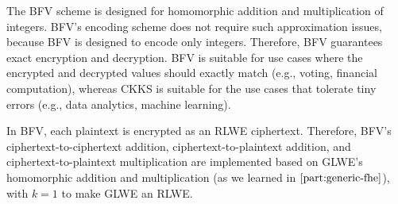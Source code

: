 The BFV scheme is designed for homomorphic addition and multiplication of integers. BFV's encoding scheme does not require such approximation issues, because BFV is designed to encode only integers. Therefore, BFV guarantees exact encryption and decryption. BFV is suitable for use cases where the encrypted and decrypted values should exactly match (e.g., voting, financial computation), whereas CKKS is suitable for the use cases that tolerate tiny errors (e.g., data analytics, machine learning).  

In BFV, each plaintext is encrypted as an RLWE ciphertext. Therefore, BFV's ciphertext-to-ciphertext addition, ciphertext-to-plaintext addition, and ciphertext-to-plaintext multiplication are implemented based on GLWE's homomorphic addition and multiplication (as we learned in $\autoref{part:generic-fhe}$), with $k = 1$ to make GLWE an RLWE. 




